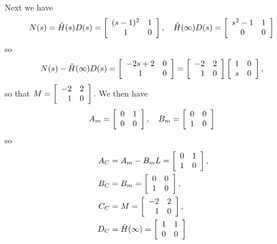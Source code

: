 \documentclass{article}
\begin{document}
Next we have
$$
N(s) = \tilde{H}(s)D(s) =
\left[\begin{array}{c c}
  (s-1)^2 & 1 \\
  1       & 0
\end{array}\right], \quad
\tilde{H}(\infty)D(s) =
\left[\begin{array}{c c}
  s^2 - 1 & 1 \\
  0       & 0
\end{array}\right]
$$
so
$$
N(s) - \tilde{H}(\infty)D(s) =
\left[\begin{array}{c c}
  -2s + 2 & 0 \\
   1      & 0
\end{array}\right]
=
\left[\begin{array}{r r r}
  -2 & 2 \\
   1 & 0
\end{array}\right]
\left[\begin{array}{c c}
  1   & 0 \\
  s   & 0
\end{array}\right],
$$
so that
$
M =
\left[\begin{array}{r r}
  -2 & 2 \\
   1 & 0
\end{array}\right].
$
We then have
$$
A_m =
\left[\begin{array}{c c c }
   0 & 1 \\
   0 & 0
\end{array}\right], \quad
B_m =
\left[\begin{array}{c c}
   0 & 0 \\
   1 & 0
\end{array}\right]
$$
so
\begin{align*}
A_C &= A_m - B_m L =
\left[\begin{array}{c c}
   0 & 1 \\
   1 & 0
\end{array}\right], \\
B_C &= B_m =
\left[\begin{array}{c c}
   0 & 0 \\
   1 & 0
\end{array}\right], \\\
C_C &= M =
\left[\begin{array}{r r}
  -2 & 2 \\
   1 & 0
\end{array}\right], \\\
D_C &= \hat{H}(\infty) =
\left[\begin{array}{c c}
   1 & 1 \\
   0 & 0
\end{array}\right]
\end{align*}
\end{document}
